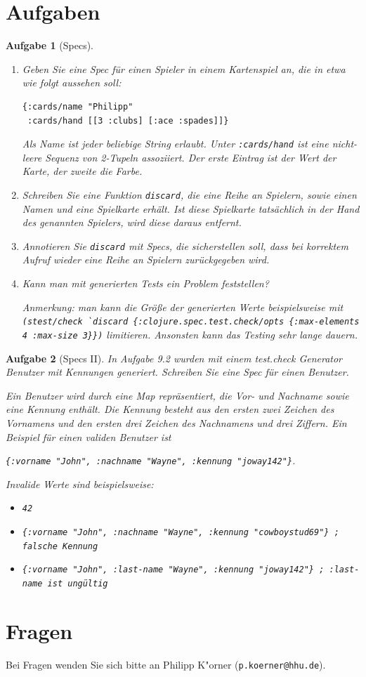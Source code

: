 \documentclass[11pt,a4paper]{article}
\newcounter{numb}
\theoremstyle{break}
\newtheorem{aufgabe}{Aufgabe}[numb]
\begin{document}
\section{Aufgaben}
\begin{aufgabe}[Specs]
\begin{enumerate}[label=\alph*)]
\item
Geben Sie eine Spec f\"ur einen Spieler in einem Kartenspiel an,
die in etwa wie folgt aussehen soll:

\begin{verbatim}
{:cards/name "Philipp"
 :cards/hand [[3 :clubs] [:ace :spades]]} 
\end{verbatim}

Als Name ist jeder beliebige String erlaubt.
Unter \verb|:cards/hand| ist eine nicht-leere Sequenz von 2-Tupeln assoziiert.
Der erste Eintrag ist der Wert der Karte, der zweite die Farbe.

\item
Schreiben Sie eine Funktion \verb|discard|,
die eine Reihe an Spielern,
sowie einen Namen und eine Spielkarte erh\"alt.
Ist diese Spielkarte tats\"achlich in der Hand
des genannten Spielers, wird diese daraus entfernt.

\item
Annotieren Sie \verb|discard| mit Specs,
die sicherstellen soll,
dass bei korrektem Aufruf wieder eine Reihe
an Spielern zur\"uckgegeben wird.

\item
Kann man mit generierten Tests ein Problem feststellen?

Anmerkung: man kann die Gr\"o\ss{}e der generierten Werte beispielsweise mit\\
\verb|(stest/check `discard {:clojure.spec.test.check/opts {:max-elements 4 :max-size 3}})|
limitieren. Ansonsten kann das Testing sehr lange dauern.
\end{enumerate}
\end{aufgabe}

\begin{aufgabe}[Specs II]
    In Aufgabe 9.2 wurden mit einem test.check Generator Benutzer mit Kennungen generiert.
    Schreiben Sie eine Spec f\"ur einen Benutzer.

    Ein Benutzer wird durch eine Map repr\"asentiert,
    die Vor- und Nachname sowie eine Kennung enth\"alt.
    Die Kennung besteht aus den ersten zwei Zeichen des Vornamens
    und den ersten drei Zeichen des Nachnamens und drei Ziffern.
    Ein Beispiel f\"ur einen validen Benutzer ist 
    
    \verb|{:vorname "John", :nachname "Wayne", :kennung "joway142"}|.

    Invalide Werte sind beispielsweise:
    \begin{itemize}
        \item \verb|42|
        \item \verb|{:vorname "John", :nachname "Wayne", :kennung "cowboystud69"} ; falsche Kennung|
        \item \verb|{:vorname "John", :last-name "Wayne", :kennung "joway142"} ; :last-name ist ungültig|
    \end{itemize}
\end{aufgabe}


\section*{Fragen}
Bei Fragen wenden Sie sich bitte an Philipp K"orner (\texttt{p.koerner@hhu.de}).
\end{document}
